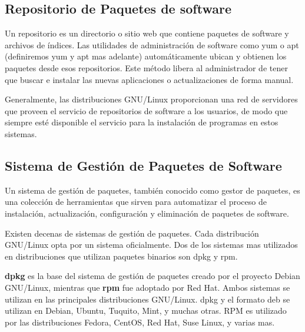 \documentclass[12pt]{article}
\begin{document}
\subsection*{Repositorio de Paquetes de software}



Un repositorio es un directorio o sitio web que contiene paquetes de software y archivos de índices. 
Las utilidades de administración de software como yum o apt (definiremos yum y apt mas adelante)
automáticamente ubican y obtienen 
los paquetes desde esos repositorios. Este método libera al administrador de tener que buscar e instalar las nuevas aplicaciones o actualizaciones de forma manual. 

Generalmente, las distribuciones GNU/Linux proporcionan una red de servidores que proveen 
el servicio de repositorios de software a los usuarios, de modo que siempre
esté disponible el servicio para la instalación de programas en estos sistemas.


\subsection*{Sistema de Gestión de Paquetes de Software}

Un sistema de gestión de paquetes, también conocido como gestor de paquetes, es una colección de herramientas que sirven para automatizar el proceso de instalación, actualización, configuración y eliminación de paquetes de software.

Existen decenas de sistemas de gestión de paquetes. Cada distribución GNU/Linux opta 
por un sistema oficialmente. Dos de los sistemas mas utilizados en distribuciones
que utilizan paquetes binarios son dpkg y rpm.

{\bf dpkg} es la base del sistema de gestión de paquetes creado por el proyecto Debian GNU/Linux, mientras que {\bf rpm}
fue adoptado por Red Hat.
Ambos sistemas se utilizan en las principales distribuciones GNU/Linux. dpkg y el formato
deb se utilizan en Debian, Ubuntu, Tuquito, Mint, y muchas otras. RPM es utilizado por
las distribuciones Fedora, CentOS, Red Hat, Suse Linux, y varias mas.
\end{document}
